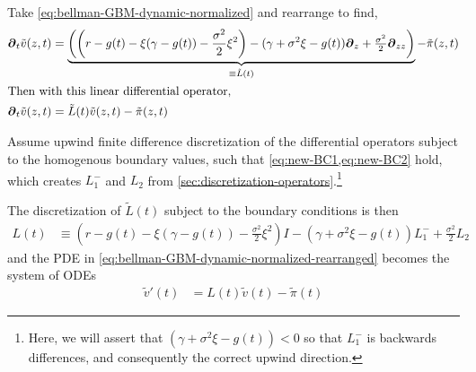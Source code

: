 \documentclass[11pt]{article}
\newcommand{\D}[1][]{\ensuremath{\boldsymbol{\partial}_{#1}}}
\newcommand{\R}{\ensuremath{\mathbb{R}}}
\begin{document}
Take \cref{eq:bellman-GBM-dynamic-normalized} and rearrange to find,
\begin{align}
	\D[t]\tilde{v}(z,t) &= \underbrace{\left(\left(r - g(t)- \xi(\gamma-g(t)) - \frac{\sigma^2}{2}\xi^2\right) - (\gamma + \sigma^2\xi - g(t)) \D[z] + \tfrac{\sigma^2}{2} \D[zz]\right)}_{\equiv \tilde{L}(t)} - \tilde{\pi}(z,t) \label{eq:bellman-GBM-dynamic-normalized-rearranged}\\
	\intertext{Then with this linear differential operator,}
	\D[t]\tilde{v}(z,t) &= \tilde{L}(t) \tilde{v}(z,t) - \tilde{\pi}(z,t)
\end{align}

Assume upwind finite difference discretization of the differential operators subject to the homogenous boundary values, such that \cref{eq:new-BC1,eq:new-BC2} hold, which creates $L^{-}_1$ and $L_2$ from \cref{sec:discretization-operators}.\footnote{Here, we will assert that $(\gamma + \sigma^2\xi - g(t)) < 0$ so that $L^{-}_1$ is backwards differences, and consequently the correct upwind direction.}

The discretization of $\tilde{L}(t)$ subject to the boundary conditions is then
\begin{align}
L(t) &\equiv \left(r - g(t)- \xi(\gamma-g(t)) - \frac{\sigma^2}{2}\xi^2\right) I - (\gamma + \sigma^2\xi - g(t)) L^{-}_1 + \tfrac{\sigma^2}{2} L_2
\end{align}
and the PDE in \cref{eq:bellman-GBM-dynamic-normalized-rearranged} becomes the system of ODEs
\begin{align}
	\tilde{v}'(t) &= L(t) \tilde{v}(t) - \tilde{\pi}(t)
\end{align}	


\end{document}
